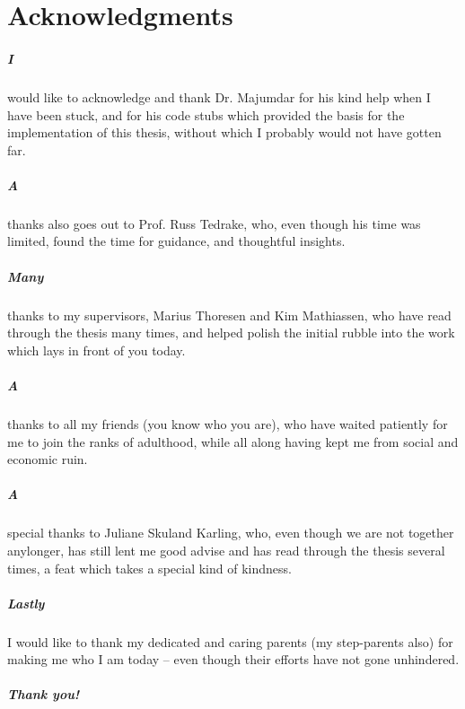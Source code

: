 \chapter{Acknowledgments}

\paragraph{I} would like to acknowledge and thank Dr. Majumdar for his kind help
when I have been stuck, and for his code stubs which provided the basis for the
implementation of this thesis, without which I probably would not have gotten
far.

\paragraph{A} thanks also goes out to Prof. Russ Tedrake, who, even though his
time was limited, found the time for guidance, and thoughtful insights.

\paragraph{Many} thanks to my supervisors, Marius Thoresen and Kim Mathiassen,
who have read through the thesis many times, and helped polish the initial
rubble into the work which lays in front of you today.

\paragraph{A} thanks to all my friends (you know who you are), who have waited
patiently for me to join the ranks of adulthood, while all along having kept me
from social and economic ruin.

\paragraph{A} special thanks to Juliane Skuland Karling, who, even though we are
not together anylonger, has still lent me good advise and has read through the
thesis several times, a feat which takes a special kind of kindness.

\paragraph{Lastly} I would like to thank my dedicated and caring parents (my
step-parents also) for making me who I am today -- even though their efforts
have not gone unhindered.


\paragraph{Thank you!}

